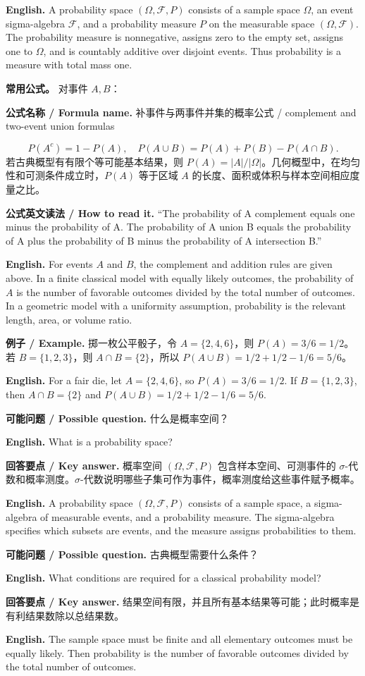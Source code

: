 \documentclass[UTF8,11pt,a4paper]{ctexart}
\newcommand{\EN}[1]{\par\noindent\textbf{English.} #1\par}
\newcommand{\READ}[1]{\par\noindent\textbf{公式英文读法 / How to read it.} #1\par}
\newcommand{\FORMULA}[2]{\par\noindent\textbf{公式名称 / Formula name.} #1 / #2\par}
\newcommand{\EX}[2]{\par\noindent\textbf{例子 / Example.} #1\par\EN{#2}}
\newcommand{\ASK}[4]{\par\noindent\textbf{可能问题 / Possible question.} #1\par\EN{#2}\noindent\textbf{回答要点 / Key answer.} #3\par\EN{#4}\medskip}
\begin{document}
\EN{A probability space $(\Omega,\mathcal F,P)$ consists of a sample space $\Omega$, an event sigma-algebra $\mathcal F$, and a probability measure $P$ on the measurable space $(\Omega,\mathcal F)$. The probability measure is nonnegative, assigns zero to the empty set, assigns one to $\Omega$, and is countably additive over disjoint events. Thus probability is a measure with total mass one.}

\noindent\textbf{常用公式。} 对事件 $A,B$：
\FORMULA{补事件与两事件并集的概率公式}{complement and two-event union formulas}
\[
P(A^c)=1-P(A),\quad P(A\cup B)=P(A)+P(B)-P(A\cap B).
\]
若古典概型有有限个等可能基本结果，则 $P(A)=|A|/|\Omega|$。几何概型中，在均匀性和可测条件成立时，$P(A)$ 等于区域 $A$ 的长度、面积或体积与样本空间相应度量之比。
\READ{“The probability of A complement equals one minus the probability of A. The probability of A union B equals the probability of A plus the probability of B minus the probability of A intersection B.”}
\EN{For events $A$ and $B$, the complement and addition rules are given above. In a finite classical model with equally likely outcomes, the probability of $A$ is the number of favorable outcomes divided by the total number of outcomes. In a geometric model with a uniformity assumption, probability is the relevant length, area, or volume ratio.}

\EX{掷一枚公平骰子，令 $A=\{2,4,6\}$，则 $P(A)=3/6=1/2$。若 $B=\{1,2,3\}$，则 $A\cap B=\{2\}$，所以 $P(A\cup B)=1/2+1/2-1/6=5/6$。}{For a fair die, let $A=\{2,4,6\}$, so $P(A)=3/6=1/2$. If $B=\{1,2,3\}$, then $A\cap B=\{2\}$ and $P(A\cup B)=1/2+1/2-1/6=5/6$.}

\ASK{什么是概率空间？}{What is a probability space?}{概率空间 $(\Omega,\mathcal F,P)$ 包含样本空间、可测事件的 $\sigma$-代数和概率测度。$\sigma$-代数说明哪些子集可作为事件，概率测度给这些事件赋予概率。}{A probability space $(\Omega,\mathcal F,P)$ consists of a sample space, a sigma-algebra of measurable events, and a probability measure. The sigma-algebra specifies which subsets are events, and the measure assigns probabilities to them.}

\ASK{古典概型需要什么条件？}{What conditions are required for a classical probability model?}{结果空间有限，并且所有基本结果等可能；此时概率是有利结果数除以总结果数。}{The sample space must be finite and all elementary outcomes must be equally likely. Then probability is the number of favorable outcomes divided by the total number of outcomes.}
\end{document}
